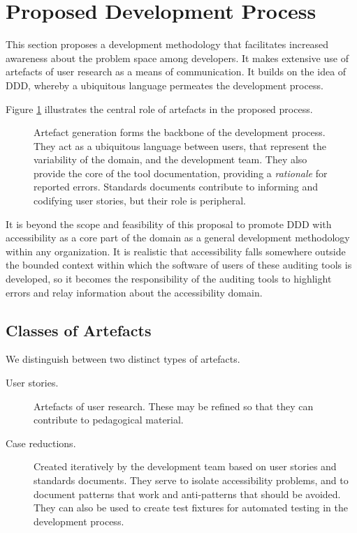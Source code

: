 \section{Proposed Development Process} %
\label{sec:proposed_development_process}

This section proposes a development methodology that facilitates increased awareness about the problem space among developers. It makes extensive use of artefacts of user research as a means of communication. It builds on the idea of \ac{DDD}, whereby a ubiquitous language permeates the development process. 

Figure \ref{fig:devprocess} illustrates the central role of artefacts in the proposed process.

\begin{figure}
\center

\label{fig:devprocess}
\caption{Artefact generation forms the backbone of the development process. They act as a ubiquitous language between users, that represent the variability of the domain, and the development team. They also provide the core of the tool documentation, providing a \emph{rationale} for reported errors. Standards documents contribute to informing and codifying user stories, but their role is peripheral.}
\end{figure}

It is beyond the scope and feasibility of this proposal to promote \ac{DDD} with accessibility as a core part of the domain as a general development methodology within any organization. It is realistic that accessibility falls somewhere outside the bounded context within which the software of users of these auditing tools is developed, so it becomes the responsibility of the auditing tools to highlight errors and relay information about the accessibility domain.

\subsection{Classes of Artefacts} %
\label{sub:classes_of_artefacts}

We distinguish between two distinct types of artefacts. 

\begin{description}
	\item[User stories.] Artefacts of user research. These may be refined so that they can contribute to pedagogical material.
	\item[Case reductions.] Created iteratively by the development team based on user stories and standards documents. They serve to isolate accessibility problems, and to document patterns that work and anti-patterns that should be avoided. They can also be used to create test fixtures for automated testing in the development process.

\end{description}

